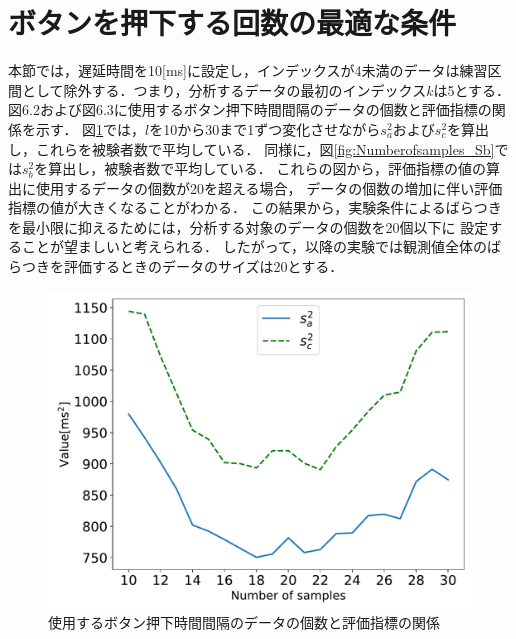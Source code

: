 \section{ボタンを押下する回数の最適な条件}
本節では，遅延時間を10[ms]に設定し，インデックスが4未満のデータは練習区間として除外する．つまり，分析するデータの最初のインデックス$k$は5とする．
図6.2および図6.3に使用するボタン押下時間間隔のデータの個数と評価指標の関係を示す．
図\ref{fig:NumberofSamples_Sa_Sc}では，$l$を10から30まで1ずつ変化させながら$s^2_{a}$および$s^2_{c}$を算出し，これらを被験者数で平均している．
同様に，図\ref{fig:Numberofsamples_Sb}では$s^2_{b}$を算出し，被験者数で平均している．
これらの図から，評価指標の値の算出に使用するデータの個数が20を超える場合，
データの個数の増加に伴い評価指標の値が大きくなることがわかる．
この結果から，実験条件によるばらつきを最小限に抑えるためには，分析する対象のデータの個数を20個以下に
設定することが望ましいと考えられる．
したがって，以降の実験では観測値全体のばらつきを評価するときのデータのサイズは20とする．
\begin{figure}[tbp]
  \centering
  \includegraphics[scale=0.6]{figures/Yobi/Var/NumberOfSamples_varSaSc.pdf}
  \caption{使用するボタン押下時間間隔のデータの個数と評価指標の関係}
  \label{fig:NumberofSamples_Sa_Sc}
\end{figure}
